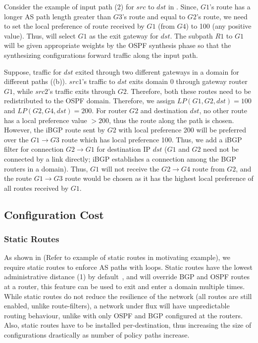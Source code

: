 Consider the example of input path (2) for $src$ to $dst$ 
in . Since, $G1$'s route has a longer AS 
path length greater than $G3$'s route and equal to $G2$'s route,
we need to set the local preference of route received by $G1$ 
(from $G4$) to 100 (any positive value). Thus,  
will select $G1$ as the exit gateway for $dst$. The subpath
$R1$ to $G1$ will be given appropriate weights by the OSPF
synthesis phase so that the synthesizing configurations 
forward traffic along the input path. 

Suppose, traffic for $dst$ exited through two different
gateways in a domain for different paths ((b)).
$src1$'s traffic to $dst$ exits domain 0 through 
gateway router $G1$, while $src2$'s traffic exits 
through $G2$. Therefore, both these routes need to be 
redistributed to the OSPF domain. Therefore, we assign
$LP(G1,G2,dst) = 100$ and $LP(G2,G4,dst) = 200$. For 
router $G2$ and destination $dst$, 
no other route has a local preference value $>200$, thus 
the route along the path is chosen. However, the iBGP route
sent by $G2$ with local preference 200 will be preferred over
the $G1\rightarrow G3$ route which has local preference 100.
Thus, we add a iBGP filter for connection $G2 \rightarrow G1$ for
destination IP $dst$ ($G1$ and $G2$ need not be connected by a 
link directly; iBGP establishes a connection among the 
BGP routers in a domain). Thus, $G1$ will not receive the
$G2 \rightarrow G4$ route from $G2$, and the route $G1 \rightarrow
G3$ route would be chosen as it has the highest local preference
of all routes received by $G1$. 

\subsection{Configuration Cost}
\subsubsection{Static Routes} \label{sec:static}
As shown in \Cref{} (Refer to example of 
static routes in motivating example), we require static routes 
to enforce AS paths with loops. Static routes have the lowest 
administrative distance (1) by default~\cite{ad}, and will override BGP
and OSPF routes at a router, this feature can be used to 
exit and enter a domain multiple times. While static routes
do not reduce the resilience of the network (all routes are still
enabled, unlike route-filters), a network under flux will have
unpredictable routing behaviour, unlike with only OSPF and BGP
configured at the routers. 
Also, static routes have to be installed per-destination, thus increasing
the size of configurations drastically as number of policy paths increase.

